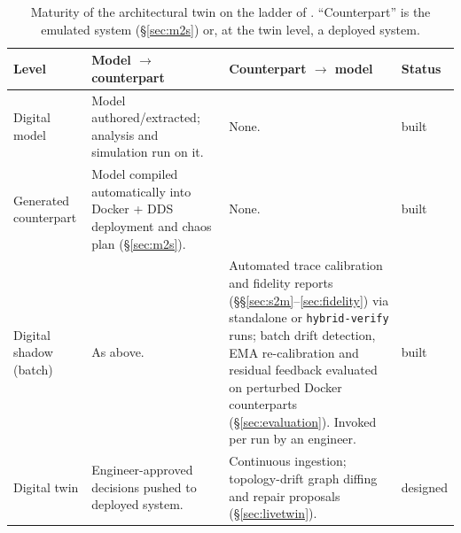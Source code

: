 \begin{table}[t]
\centering
\caption{Maturity of the architectural twin on the ladder of \citet{kritzinger2018digital}. ``Counterpart'' is the emulated system (\S\ref{sec:m2s}) or, at the twin level, a deployed system.}
\label{tab:maturity}
\small
\begin{tabularx}{\textwidth}{@{}l Y Y l@{}}
\toprule
Level & Model $\to$ counterpart & Counterpart $\to$ model & Status \\
\midrule
Digital model & Model authored/extracted; analysis and simulation run on it. & None. & built \\
Generated counterpart & Model compiled automatically into Docker + DDS deployment and chaos plan (\S\ref{sec:m2s}). & None. & built \\
Digital shadow (batch) & As above. & Automated trace calibration and fidelity reports (\S\S\ref{sec:s2m}--\ref{sec:fidelity}) via standalone or \texttt{hybrid-verify} runs; batch drift detection, EMA re-calibration and residual feedback evaluated on perturbed Docker counterparts (\S\ref{sec:evaluation}). Invoked per run by an engineer. & built \\
Digital twin & Engineer-approved decisions pushed to deployed system. & Continuous ingestion; topology-drift graph diffing and repair proposals (\S\ref{sec:livetwin}). & designed \\
\bottomrule
\end{tabularx}
\end{table}
